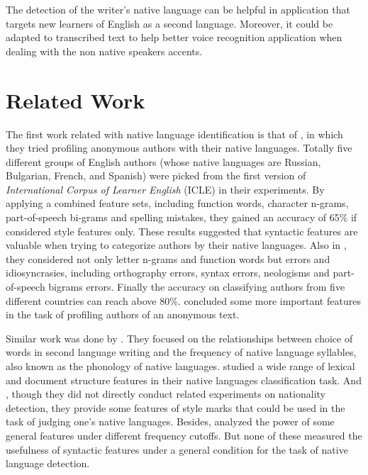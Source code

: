 \documentclass[11pt]{article}
\begin{document}
The detection of the writer's native language can be helpful in application that targets new learners of English as a second language. Moreover, it could be adapted to transcribed text to help better voice recognition application when dealing with the non native speakers accents.

\section{Related Work}
The first work related with native language identification is that of \cite{koppel2005automatically}, in which they tried profiling anonymous authors with their native languages. Totally five different groups of English authors (whose native languages are Russian, Bulgarian, French, and Spanish) were picked from the first version of {\em International Corpus of Learner English} (ICLE) in their experiments. By applying a combined feature sets, including function words, character n-grams, part-of-speech bi-grams and spelling mistakes, they gained an accuracy of 65\% if considered style features only. These results suggested that syntactic features are valuable when trying to categorize authors by their native languages. Also in \cite {koppel2005determining}, they considered not only letter n-grams and function words but errors and idiosyncrasies, including orthography errors, syntax errors, neologisms and part-of-speech bigrams errors. Finally the accuracy on classifying authors from five different countries can reach above 80\%. \cite {argamon2009automatically} concluded some more important features in the task of profiling authors of an anonymous text.

Similar work was done by \cite {tsur2007using}. They focused on the relationships between choice of words in second language writing and the frequency of native language syllables, also known as the phonology of native languages. \cite {estival2007author} studied a wide range of lexical and document structure features in their native languages classification task. And \cite {zheng2003authorship}, though they did not directly conduct related experiments on nationality detection, they provide some features of style marks that could be used in the task of judging one's native languages. Besides, \cite {gamon2004linguistic} analyzed the power of some general features under different frequency cutoffs. But none of these measured the usefulness of syntactic features under a general condition for the task of native language detection.
\end{document}
